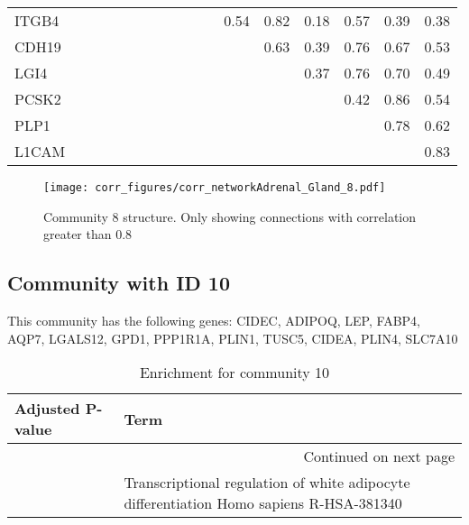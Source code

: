 \begin{longtable}{lrrrrrrrrrrrrrrrr}
ITGB4   &             &             &             &            &            &            &               &             &              &             &        0.54 &       0.82 &        0.18 &       0.57 &        0.39 &         0.38 \\
CDH19   &             &             &             &            &            &            &               &             &              &             &             &       0.63 &        0.39 &       0.76 &        0.67 &         0.53 \\
LGI4    &             &             &             &            &            &            &               &             &              &             &             &            &        0.37 &       0.76 &        0.70 &         0.49 \\
PCSK2   &             &             &             &            &            &            &               &             &              &             &             &            &             &       0.42 &        0.86 &         0.54 \\
PLP1    &             &             &             &            &            &            &               &             &              &             &             &            &             &            &        0.78 &         0.62 \\
L1CAM   &             &             &             &            &            &            &               &             &              &             &             &            &             &            &             &         0.83 \\
\end{longtable}


\begin{figure}[h!]
\centering
\texttt{[image: corr\_figures/corr\_networkAdrenal\_Gland\_8.pdf]}
\caption{Community 8 structure. Only showing connections with correlation greater than 0.8}
\end{figure}




\subsection*{Community with ID 10}
This community has the following genes: CIDEC, ADIPOQ, LEP, FABP4, AQP7, LGALS12, GPD1, PPP1R1A, PLIN1, TUSC5, CIDEA, PLIN4, SLC7A10
\\
\begin{longtable}{p{2.4cm}p{14.5cm}}
\caption{Enrichment for community 10}\\
\toprule
Adjusted \newline P-value &                                                                                     Term \\
\midrule
\endhead
\midrule
\multicolumn{2}{r}{{Continued on next page}} \\
\midrule
\endfoot

\bottomrule
\endlastfoot
                  0.00024 &  Transcriptional regulation of white adipocyte differentiation Homo sapiens R-HSA-381340 \\
\end{longtable}


